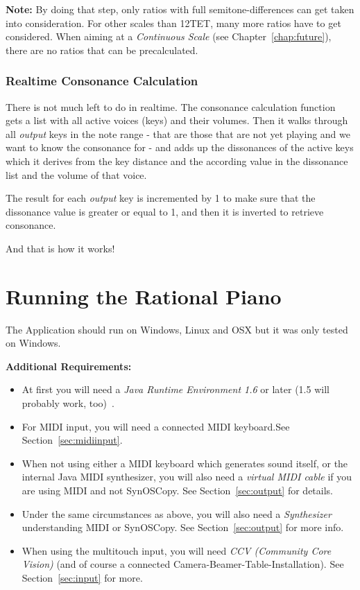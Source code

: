 \documentclass[12pt,a4paper,titlepage,oneside]{report}
\begin{document}
\textbf{Note:} By doing that step, only ratios with full semitone-differences can get taken into consideration. For other scales than 12TET, many more ratios have to get considered. When aiming at a \emph{Continuous Scale} (see Chapter~\ref{chap:future}), there are no ratios that can be precalculated.


\subsection{Realtime Consonance Calculation}

There is not much left to do in realtime. The consonance calculation function gets a list with all active voices (keys) and their volumes. Then it walks through all \emph{output} keys in the note range - that are those that are not yet playing and we want to know the consonance for - and adds up the dissonances of the active keys which it derives from the key distance and the according value in the dissonance list and the volume of that voice.

The result for each \emph{output} key is incremented by 1 to make sure that the dissonance value is greater or equal to 1, and then it is inverted to retrieve consonance.

And that is how it works!

\chapter{Running the Rational Piano}
\label{chap:running}

The Application should run on Windows, Linux and OSX but it was only tested on Windows.

\noindent
\textbf{Additional Requirements:}
\begin{itemize}
\item At first you will need a \emph{\emph{Java Runtime Environment 1.6}} or later (1.5 will probably work, too)~\cite{bib:java}.
\item For MIDI input, you will need a connected MIDI keyboard.See Section~\ref{sec:midiinput}.
\item When not using either a MIDI keyboard which generates sound itself, or the internal Java MIDI synthesizer, you will also need a \emph{virtual MIDI cable} if you are using MIDI and not SynOSCopy. See Section~\ref{sec:output} for details.
\item Under the same circumstances as above, you will also need a \emph{Synthesizer} understanding MIDI or SynOSCopy. See Section~\ref{sec:output} for more info.
\item When using the multitouch input, you will need \emph{CCV (Community Core Vision)} (and of course a connected Camera-Beamer-Table-Installation). See Section~\ref{sec:input} for more.
\end{itemize}
\end{document}
